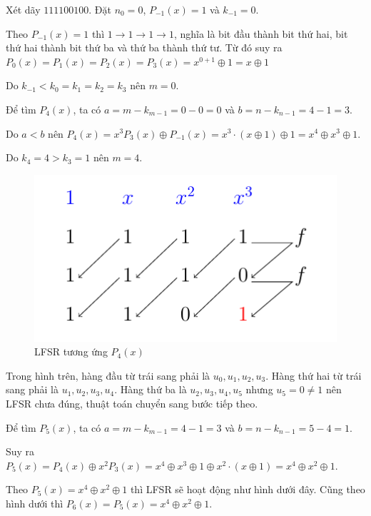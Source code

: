 \begin{example}
	Xét dãy $111100100$. Đặt $n_0 = 0$, $P_{-1}(x) = 1$ và $k_{-1} = 0$.

	Theo $P_{-1}(x) = 1$ thì $1 \to 1 \to 1 \to 1$, nghĩa là bit đầu thành bit thứ hai, bit thứ hai thành bit thứ ba và thứ ba thành thứ tư. Từ đó suy ra $P_0 (x) = P_1 (x) = P_2 (x) = P_3 (x) = x^{0+1} \oplus 1 = x \oplus 1$

	Do $k_{-1} < k_0 = k_1 = k_2 = k_3$ nên $m = 0$.

	
	Để tìm $P_4(x)$, ta có $a =  m- k_{m-1} = 0 - 0 = 0$ và $b = n - k_{n-1} = 4 - 1 = 3$.

	Do $a < b$ nên $P_4(x) = x^3 P_3(x) \oplus P_{-1}(x) = x^3 \cdot (x \oplus 1) \oplus 1 = x^4 \oplus x^3 \oplus 1$.
	
	Do $k_4 = 4 > k_3 = 1$ nên $m = 4$.

	\begin{figure}
		\centering
		\includegraphics[page=1]{figures/berlekamp_massey.pdf}
		\caption{LFSR tương ứng $P_4(x)$}
	\end{figure}
	

	Trong hình trên, hàng đầu từ trái sang phải là $u_0, u_1, u_2, u_3$. Hàng thứ hai từ trái sang phải là $u_1, u_2, u_3, u_4$. Hàng thứ ba là $u_2, u_3, u_4, u_5$ nhưng $u_5 = 0 \neq 1$ nên LFSR chưa đúng, thuật toán chuyển sang bước tiếp theo.

	Để tìm $P_5(x)$, ta có $a = m - k_{m-1} = 4 - 1 = 3$ và $b = n - k_{n-1} = 5 - 4 = 1$.

	Suy ra $P_5(x) = P_4(x) \oplus x^2 P_3 (x) = x^4 \oplus x^3 \oplus 1 \oplus x^2 \cdot (x \oplus 1) = x^4 \oplus x^2 \oplus 1$.

	Theo $P_5(x) = x^4 \oplus x^2 \oplus 1$ thì LFSR sẽ hoạt động như hình dưới đây. Cũng theo hình dưới thì $P_6(x) = P_5(x) = x^4 \oplus x^2 \oplus 1$. 
		

\end{example}

